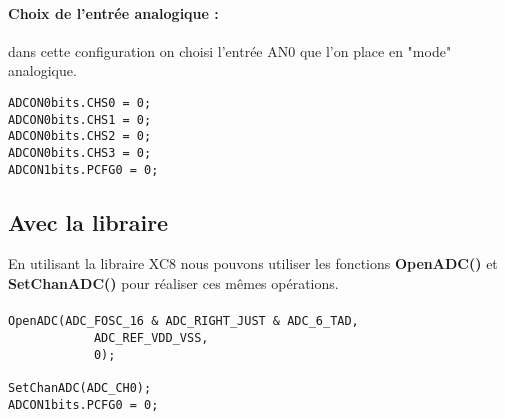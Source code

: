 \paragraph{Choix de l'entrée analogique :} dans cette configuration on choisi l'entrée AN0 que l'on place en "mode" analogique. 
 
\begin{lstlisting}
ADCON0bits.CHS0 = 0;
ADCON0bits.CHS1 = 0;
ADCON0bits.CHS2 = 0;
ADCON0bits.CHS3 = 0;
ADCON1bits.PCFG0 = 0;
\end{lstlisting}

\subsection{Avec la libraire}
En utilisant la libraire XC8 nous pouvons utiliser les fonctions \textbf{OpenADC()} et \textbf{ SetChanADC()} pour réaliser ces mêmes opérations.

\paragraph{}
\begin{lstlisting}
OpenADC(ADC_FOSC_16 & ADC_RIGHT_JUST & ADC_6_TAD,
            ADC_REF_VDD_VSS,
            0);

SetChanADC(ADC_CH0);
ADCON1bits.PCFG0 = 0;
\end{lstlisting}


